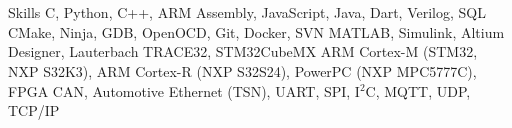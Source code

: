 \section{}{Skills\hspace{500pt}}
 \resumeEntryStart
   {C, Python, C++, ARM Assembly, JavaScript, Java, Dart, Verilog, SQL}
   {CMake, Ninja, GDB, OpenOCD, Git, Docker, SVN}
   {MATLAB, Simulink, Altium Designer, Lauterbach TRACE32, STM32CubeMX}
   {ARM Cortex-M (STM32, NXP S32K3), ARM Cortex-R (NXP S32S24), PowerPC (NXP MPC5777C), FPGA}
   {CAN, Automotive Ethernet (TSN), UART, SPI, I$^2$C, MQTT, UDP, TCP/IP}
 \resumeEntryEnd